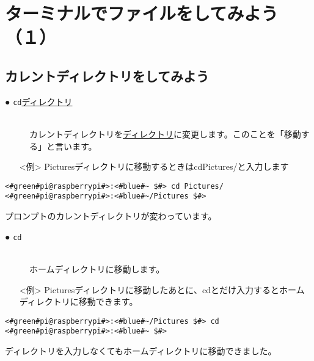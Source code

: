 \newpage
\section{ターミナルでファイルをしてみよう（１）}

\subsection{カレントディレクトリをしてみよう}
\begin{description}
\item[● \texttt{cd}\textvisiblespace \underline{ディレクトリ}]\mbox{}\\
カレントディレクトリを\underline{ディレクトリ}に変更します。このことを「移動する」と言います。
\end{description}
\begin{itemize}
\item[<例>] Picturesディレクトリに移動するときはcd\textvisiblespace Pictures/と入力します
\end{itemize}

\begin{lstlisting}[caption=cd directoryの例, label=cdDir]
<#green#pi@raspberrypi#>:<#blue#~ $#> cd Pictures/
<#green#pi@raspberrypi#>:<#blue#~/Pictures $#>
\end{lstlisting}
プロンプトのカレントディレクトリが変わっています。

\begin{description}
\item[● \texttt{cd}]\mbox{}\\
ホームディレクトリに移動します。
\end{description}
\begin{itemize}
\item[<例>] Picturesディレクトリに移動したあとに、cdとだけ入力するとホームディレクトリに移動できます。
\end{itemize}
\begin{lstlisting}[caption=cdの例, label=cd]
<#green#pi@raspberrypi#>:<#blue#~/Pictures $#> cd
<#green#pi@raspberrypi#>:<#blue#~ $#> 
\end{lstlisting}
ディレクトリを入力しなくてもホームディレクトリに移動できました。\\



